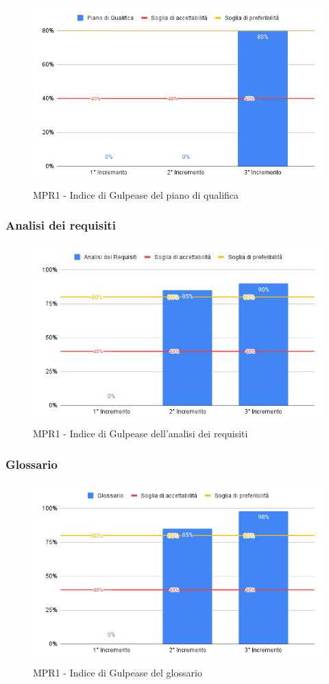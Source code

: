 \begin{figure}[H]
	\centering
	\includegraphics[scale = 0.6]{sezioni/Images/PdQ.png}
	\caption{MPR1 - Indice di Gulpease del piano di qualifica}
\end{figure}

\subsubsection{Analisi dei requisiti}

\begin{figure}[H]
	\centering
	\includegraphics[scale = 0.6]{sezioni/Images/AdR.png}
	\caption{MPR1 - Indice di Gulpease dell'analisi dei requisiti}
\end{figure}

\subsubsection{Glossario}

\begin{figure}[H]
	\centering
	\includegraphics[scale = 0.6]{sezioni/Images/Glossario.png}
	\caption{MPR1 - Indice di Gulpease del glossario}
\end{figure}